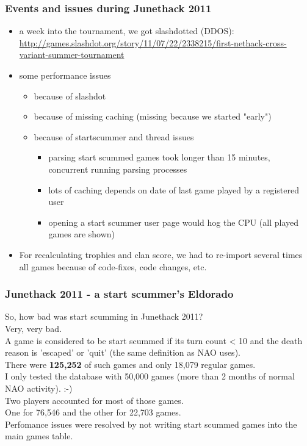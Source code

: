 \documentclass[handout]{beamer}
\begin{document}
\begin{frame}
\frametitle{Events and issues during Junethack 2011}
  \pause
  \begin{itemize}[<+->]
    \item a week into the tournament, we got slashdotted (DDOS): \url{http://games.slashdot.org/story/11/07/22/2338215/first-nethack-cross-variant-summer-tournament}
    \item some performance issues
    \begin{itemize}[<+->]
      \item because of slashdot
      \item because of missing caching (missing because we started "early")
      \item because of startscummer and thread issues
      \begin{itemize}[<+->]
        \item parsing start scummed games took longer than 15 minutes, concurrent running parsing processes
        \item lots of caching depends on date of last game played by a registered user
        \item opening a start scummer user page would hog the CPU (all played games are shown)
      \end{itemize}
    \end{itemize}
    \item For recalculating trophies and clan score, we had to re-import several times all games because of code-fixes, code changes, etc.
  \end{itemize}
\end{frame}

\begin{frame}
\frametitle{Junethack 2011 - a start scummer's Eldorado}
  So, how bad was start scumming in Junethack 2011?\pause\\
  Very, very bad.\pause\\
  A game is considered to be start scummed if its turn count < 10 and the death reason is 'escaped' or 'quit' (the same definition as NAO uses).\pause\\
  There were \textbf{125,252} of such games and only 18,079 regular games.\pause\\
  I only tested the database with 50,000 games (more than 2 months of normal NAO activity). :-)\pause\\
  Two players accounted for most of those games.\pause\\
  One for 76,546 and the other for 22,703 games.\pause\\
  Perfomance issues were resolved by not writing start scummed games into the main games table.
\end{frame}
\end{document}
